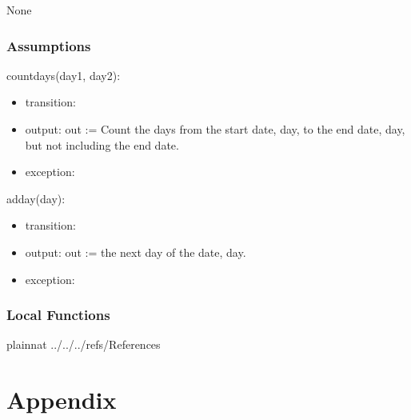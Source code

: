 \documentclass[12pt, titlepage]{article}
\begin{document}
None

\subsubsection{Assumptions}



\noindent countdays(day1, day2):
\begin{itemize}
\item transition:
\item output: out := Count the days from the start  date, day, to the end date, day, but not including the end date.
\item exception: 
\end{itemize}

\noindent adday(day):
\begin{itemize}
\item transition: 
\item output: out := the next day of the date, day.
\item exception: 
\end{itemize}


\subsubsection{Local Functions}



\newpage

 {plainnat}
 {../../../refs/References}

\newpage

\section{Appendix} \label{Appendix}

\end{document}
